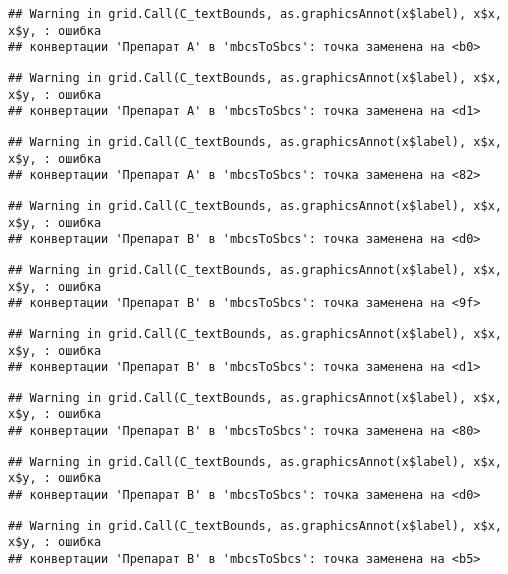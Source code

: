 \documentclass[
]{article}
\begin{document}
\begin{verbatim}
## Warning in grid.Call(C_textBounds, as.graphicsAnnot(x$label), x$x, x$y, : ошибка
## конвертации 'Препарат A' в 'mbcsToSbcs': точка заменена на <b0>
\end{verbatim}

\begin{verbatim}
## Warning in grid.Call(C_textBounds, as.graphicsAnnot(x$label), x$x, x$y, : ошибка
## конвертации 'Препарат A' в 'mbcsToSbcs': точка заменена на <d1>
\end{verbatim}

\begin{verbatim}
## Warning in grid.Call(C_textBounds, as.graphicsAnnot(x$label), x$x, x$y, : ошибка
## конвертации 'Препарат A' в 'mbcsToSbcs': точка заменена на <82>
\end{verbatim}

\begin{verbatim}
## Warning in grid.Call(C_textBounds, as.graphicsAnnot(x$label), x$x, x$y, : ошибка
## конвертации 'Препарат B' в 'mbcsToSbcs': точка заменена на <d0>
\end{verbatim}

\begin{verbatim}
## Warning in grid.Call(C_textBounds, as.graphicsAnnot(x$label), x$x, x$y, : ошибка
## конвертации 'Препарат B' в 'mbcsToSbcs': точка заменена на <9f>
\end{verbatim}

\begin{verbatim}
## Warning in grid.Call(C_textBounds, as.graphicsAnnot(x$label), x$x, x$y, : ошибка
## конвертации 'Препарат B' в 'mbcsToSbcs': точка заменена на <d1>
\end{verbatim}

\begin{verbatim}
## Warning in grid.Call(C_textBounds, as.graphicsAnnot(x$label), x$x, x$y, : ошибка
## конвертации 'Препарат B' в 'mbcsToSbcs': точка заменена на <80>
\end{verbatim}

\begin{verbatim}
## Warning in grid.Call(C_textBounds, as.graphicsAnnot(x$label), x$x, x$y, : ошибка
## конвертации 'Препарат B' в 'mbcsToSbcs': точка заменена на <d0>
\end{verbatim}

\begin{verbatim}
## Warning in grid.Call(C_textBounds, as.graphicsAnnot(x$label), x$x, x$y, : ошибка
## конвертации 'Препарат B' в 'mbcsToSbcs': точка заменена на <b5>
\end{verbatim}
\end{document}
